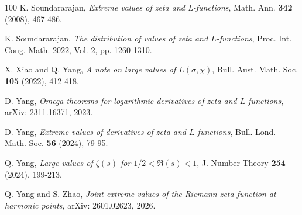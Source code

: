 \documentclass[12pt]{amsart}
\numberwithin{equation}{section}
\theoremstyle{plain}
\theoremstyle{remark}
\theoremstyle{definition}
\theoremstyle{remark}
\begin{document}
\begin{thebibliography}{100}
K. Soundararajan, {\it Extreme values of zeta and L-functions}, Math. Ann. {\bf 342} (2008), 467-486.

K. Soundararajan, {\it The distribution of values of zeta and $L$-functions}, Proc. Int. Cong.
Math. 2022, Vol. 2, pp. 1260-1310.

X. Xiao and Q. Yang, {\it A note on large values of $L(\sigma,\chi)$}, Bull. Aust. Math. Soc. {\bf 105} (2022), 412-418.


D. Yang, {\it Omega theorems for logarithmic derivatives of zeta and $L$-functions}, arXiv: 2311.16371, 2023.

D. Yang, {\it Extreme values of derivatives of zeta and $L$-functions}, Bull. Lond. Math. Soc. {\bf56} (2024), 79-95.

Q. Yang, {\it Large values of $\zeta(s)$ for $1/2<\Re(s)<1$}, J. Number Theory {\bf254} (2024), 199-213.

Q. Yang and S. Zhao, {\it Joint extreme values of the Riemann zeta function at harmonic points},
arXiv: 2601.02623, 2026.

\end{thebibliography}
\bigskip
\end{document}

